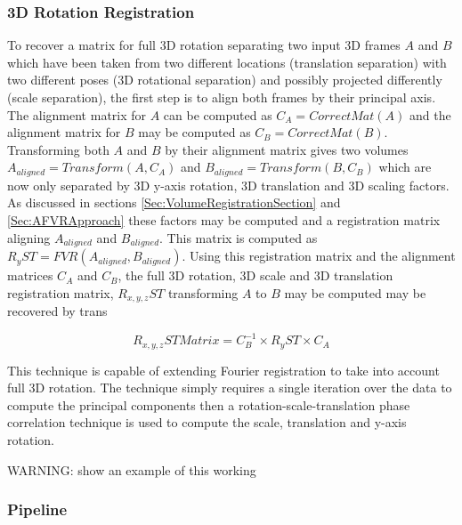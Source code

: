 \subsubsection{3D Rotation Registration}

To recover a matrix for full 3D rotation separating two input 3D frames $A$ and $B$ which have been taken from two different locations (translation separation) with two different poses (3D rotational separation) and possibly projected differently (scale separation), the first step is to align both frames by their principal axis. The alignment matrix for $A$ can be computed as $C_A = CorrectMat(A)$ and the alignment matrix for $B$ may be computed as $C_B = CorrectMat(B)$. Transforming both $A$ and $B$ by their alignment matrix gives two volumes $A_{aligned} = Transform(A, C_A)$ and $B_{aligned} = Transform(B, C_B)$ which are now only separated by 3D y-axis rotation, 3D translation and 3D scaling factors. As discussed in sections \ref{Sec:VolumeRegistrationSection} and \ref{Sec:AFVRApproach} these factors may be computed and a registration matrix aligning $A_{aligned}$ and $B_{aligned}$. This matrix is computed as $R_{y}ST = FVR(A_{aligned},B_{aligned})$. Using this registration matrix and the alignment matrices $C_{A}$ and $C_{B}$, the full 3D rotation, 3D scale and 3D translation registration matrix, $R_{x,y,z}ST$ transforming $A$ to $B$ may be computed  may be recovered by trans

\begin{equation} \label{eqn:FullRSTTransform}
R_{x,y,z}ST Matrix = C_{B}^{-1} \times R_{y}ST \times C_A
\end{equation}

This technique is capable of extending Fourier registration to take into account full 3D rotation. The technique simply requires a single iteration over the data to compute the principal components then a rotation-scale-translation phase correlation technique is used to compute the scale, translation and y-axis rotation. 

WARNING: show an example of this working

\subsubsection{Pipeline}

